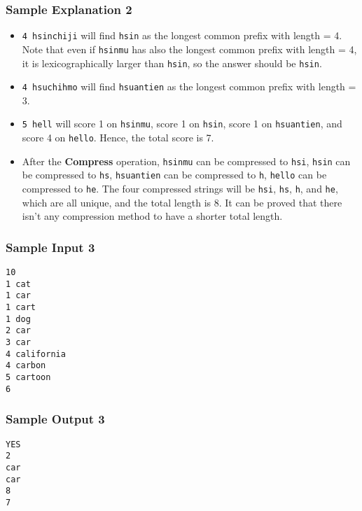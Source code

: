 \subsubsection{Sample Explanation 2}

\begin{itemize}
    \item \texttt{4 hsinchiji} will find \texttt{hsin} as the longest common prefix with length = 4. Note that even if \texttt{hsinmu} has also the longest common prefix with length = 4, it is lexicographically larger than \texttt{hsin}, so the answer should be \texttt{hsin}.
    \item \texttt{4 hsuchihmo} will find \texttt{hsuantien} as the longest common prefix with length = 3.
    \item \texttt{5 hell} will score 1 on \texttt{hsinmu}, score 1 on \texttt{hsin}, score 1 on \texttt{hsuantien}, and score 4 on \texttt{hello}. Hence, the total score is 7.
    \item After the \textbf{Compress} operation, \texttt{hsinmu} can be compressed to \texttt{hsi}, \texttt{hsin} can be compressed to \texttt{hs}, \texttt{hsuantien} can be compressed to \texttt{h}, \texttt{hello} can be compressed to \texttt{he}. The four compressed strings will be \texttt{hsi}, \texttt{hs}, \texttt{h}, and \texttt{he}, which are all unique, and the total length is 8. It can be proved that there isn't any compression method to have a shorter total length.
\end{itemize}

\newpage

\begin{multicols}{2}
\subsubsection{Sample Input 3}
\begin{verbatim}
10
1 cat
1 car
1 cart
1 dog
2 car
3 car
4 california
4 carbon
5 cartoon
6
\end{verbatim}
\columnbreak
\subsubsection{Sample Output 3}
\begin{verbatim}
YES
2
car
car
8
7





\end{verbatim}
\end{multicols}
